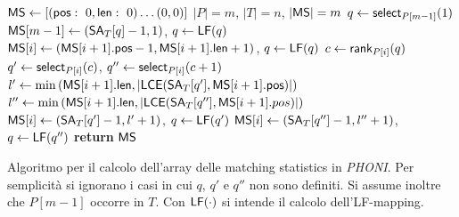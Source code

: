 \begin{algorithm}
  \small
  \begin{algorithmic}[1]
    \State $\mbox{\rm {\sf MS}}\gets [(\mbox{\rm {\sf pos}}:\,\,0,\mbox{\rm {\sf len}}:\,\,0)\ldots (0,0)]$
     \Comment $|P|=m$, $|T|=n$, $|\mbox{\rm {\sf MS}}|=m$
    \State $q\gets \mbox{\rm {\sf select}}_{P[m-1]}(1)$
    \State $\mbox{\rm {\sf MS}}[m-1]\gets (\mbox{\rm {\sf SA}}_T[q]-1,1)$, $q\gets \mbox{\rm {\sf LF}}(q)$
    \State $\mbox{\rm {\sf MS}}[i]\gets (\mbox{\rm {\sf MS}}[i+1].\mbox{\rm {\sf pos}}-1,\mbox{\rm {\sf MS}}[i+1].\mbox{\rm {\sf len}}+1)$, $q\gets \mbox{\rm {\sf LF}}(q)$
    \Else
    \State $c\gets \mbox{\rm {\sf rank}}_{P[i]}(q)$
    \State $q'\gets \mbox{\rm {\sf select}}_{P[i]}(c)$, $q''\gets \mbox{\rm {\sf select}}_{P[i]}(c+1)$
    \State $l'\gets \min\left(\mbox{\rm {\sf MS}}[i+1].\mbox{\rm {\sf len}}, \left|\mbox{\rm {\sf LCE}}(\mbox{\rm {\sf SA}}_T[q'],
    \mbox{\rm {\sf MS}}[i+1].\mbox{\rm {\sf pos}})\right|\right)$
    \State $l''\gets \min\left(\mbox{\rm {\sf MS}}[i+1].\mbox{\rm {\sf len}}, \left|\mbox{\rm {\sf LCE}}(\mbox{\rm {\sf SA}}_T[q''],
    \mbox{\rm {\sf MS}}[i+1].pos)\right|\right)$ 
    \EndIf
    \State $\mbox{\rm {\sf MS}}[i]\gets (\mbox{\rm {\sf SA}}_T[q']-1,l'+1)$, $q\gets \mbox{\rm {\sf LF}}(q')$
    \Else
    \State $\mbox{\rm {\sf MS}}[i]\gets (\mbox{\rm {\sf SA}}_T[q'']-1,l''+1)$, $q\gets \mbox{\rm {\sf LF}}(q'')$
    \EndIf
    \EndFor
    \State \textbf{return} $\mbox{\rm {\sf MS}}$
    \EndFunction
  \end{algorithmic}
  \caption{Algoritmo per il calcolo dell'array delle matching statistics in
  \textit{PHONI}. Per 
  semplicità si ignorano i casi in cui $q$, $q'$ e $q''$ non sono definiti. Si
  assume inoltre che $P[m-1]$ occorre in $T$. Con $\mbox{\rm {\sf LF}}(\cdot)$ si intende il
  calcolo dell'LF-mapping.}
  \label{algo:phonims}
\end{algorithm}
